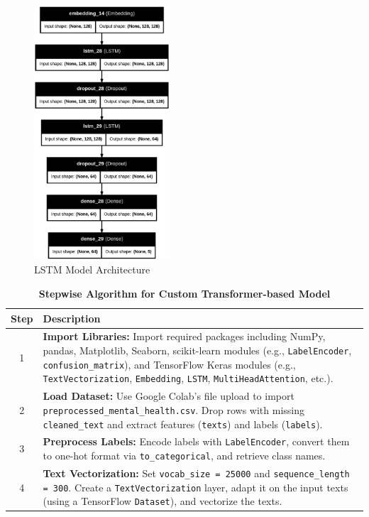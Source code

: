 \pagebreak

\begin{figure}[h!]  
    \centering
    \includegraphics[width=0.45\textwidth]{Images/LSTM MODEL.png}  
    \caption{LSTM Model Architecture}
    \label{lstm arch}  %
\end{figure}


\begin{table}[H]
    \caption*{\textbf{Stepwise Algorithm for Custom Transformer-based Model}}
    \label{tab:transformer_algorithm}
    \centering
    \renewcommand{\arraystretch}{1.3}
    \small
    \begin{tabularx}{\textwidth}{|c|X|}
        \hline
        \textbf{Step} & \textbf{Description} \\
        \hline
        1 & \textbf{Import Libraries:} Import required packages including NumPy, pandas, Matplotlib, Seaborn, scikit-learn modules (e.g., \texttt{LabelEncoder}, \texttt{confusion\_matrix}), and TensorFlow Keras modules (e.g., \texttt{TextVectorization}, \texttt{Embedding}, \texttt{LSTM}, \texttt{MultiHeadAttention}, etc.). \\
        \hline
        2 & \textbf{Load Dataset:} Use Google Colab's file upload to import \texttt{preprocessed\_mental\_health.csv}. Drop rows with missing \texttt{cleaned\_text} and extract features (\texttt{texts}) and labels (\texttt{labels}). \\
        \hline
        3 & \textbf{Preprocess Labels:} Encode labels with \texttt{LabelEncoder}, convert them to one-hot format via \texttt{to\_categorical}, and retrieve class names. \\
        \hline
        4 & \textbf{Text Vectorization:} Set \texttt{vocab\_size = 25000} and \texttt{sequence\_length = 300}. Create a \texttt{TextVectorization} layer, adapt it on the input texts (using a TensorFlow \texttt{Dataset}), and vectorize the texts. \\
        \hline
    \end{tabularx}
\end{table}

